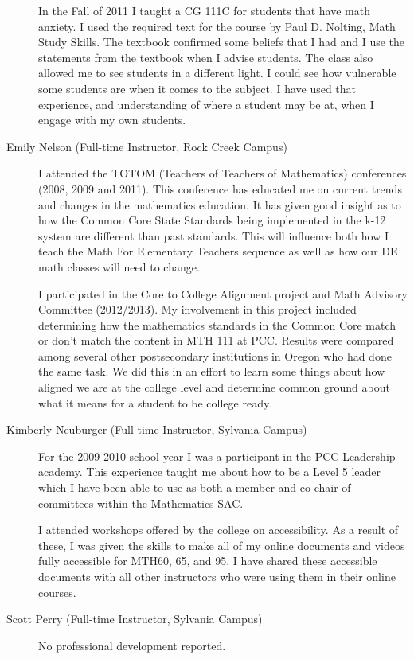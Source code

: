 \begin{description}
	In the Fall of 2011 I taught a CG 111C for students that have math anxiety.  I
	used the required text for the course by Paul D. Nolting, Math Study
	Skills.  The textbook confirmed some beliefs that I had and I use the
	statements from the textbook when I advise students.   The class also allowed
	me to see students in a
	different light. I could see how vulnerable some students are when it comes to
	the subject.  I have used that experience, and understanding of where a student
	may be at, when I engage with my own students.

	\item[Emily Nelson (Full-time Instructor, Rock Creek Campus)]
	I attended the TOTOM (Teachers of Teachers of Mathematics) conferences (2008,
	2009 and 2011).  This conference has educated me on current trends and changes
	in the mathematics education.  It has given good insight as to how the Common
	Core State Standards being implemented in the k-12 system are different than
	past standards. This will influence both how I teach the Math For Elementary
	Teachers sequence as well as how our DE math classes will need to change.

	I participated in the Core to College Alignment project and Math Advisory
	Committee (2012/2013).  My involvement in this project included determining how
	the mathematics standards in the Common Core match or don't match the
	content in MTH 111 at PCC. Results were compared among several other
	postsecondary institutions in Oregon who had done the same task.  We did this
	in an effort to learn some things about how aligned we are at the college level
	and determine common ground about what it means for a student to be college ready.

	\item[Kimberly Neuburger (Full-time Instructor, Sylvania Campus)]
	For the 2009-2010 school year I was a participant in the PCC Leadership
	academy. This experience taught me about how to be a Level 5 leader which I
	have been able to use as both a member and co-chair of committees within the
	Mathematics SAC.

	I attended workshops offered by the college on accessibility. As a result of
	these, I was given the skills to make all of my online documents and videos
	fully accessible for MTH60, 65, and 95. I have shared these accessible
	documents with all other instructors who were using them in their online
	courses.

	\item[Scott Perry (Full-time Instructor, Sylvania Campus)]
	No professional development reported.


\end{description}
